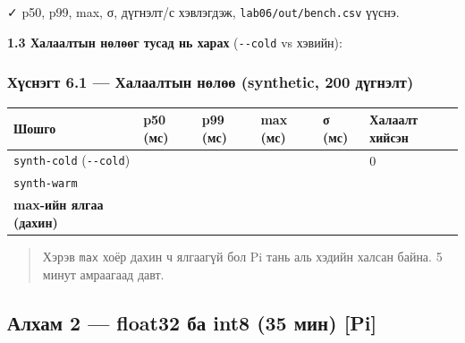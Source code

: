 ✓ p50, p99, max, σ, дүгнэлт/с хэвлэгдэж, \texttt{lab06/\allowbreak{}out/\allowbreak{}bench.\allowbreak{}csv} үүснэ.

\textbf{1.3 Халаалтын нөлөөг тусад нь харах} (\texttt{-\/-cold} vs хэвийн):

\begin{Shaded}
\begin{Highlighting}[]
 \KeywordTok{\textbackslash{}}
 \KeywordTok{\textbackslash{}}
\end{Highlighting}
\end{Shaded}

\hypertarget{ux445ux4afux441ux43dux44dux433ux442-6.1-ux445ux430ux43bux430ux430ux43bux442ux44bux43d-ux43dux4e9ux43bux4e9ux4e9-synthetic-200-ux434ux4afux433ux43dux44dux43bux442}{%
\subsubsection{Хүснэгт 6.1 --- Халаалтын нөлөө (synthetic, 200 дүгнэлт)}\label{ux445ux4afux441ux43dux44dux433ux442-6.1-ux445ux430ux43bux430ux430ux43bux442ux44bux43d-ux43dux4e9ux43bux4e9ux4e9-synthetic-200-ux434ux4afux433ux43dux44dux43bux442}}

\begingroup\scriptsize\begin{longtable}[]{@{}llllll@{}}
\toprule
Шошго & p50 (мс) & p99 (мс) & \textbf{max (мс)} & σ (мс) & Халаалт хийсэн\tabularnewline
\midrule
\endhead
\texttt{synth-cold} (\texttt{-\/-cold}) & & & & & 0\tabularnewline
\texttt{synth-warm} & & & & &\tabularnewline
\textbf{max-ийн ялгаа (дахин)} & & & & &\tabularnewline
\bottomrule
\end{longtable}\endgroup

\begin{quote}
Хэрэв \texttt{max} хоёр дахин ч ялгаагүй бол Pi тань аль хэдийн халсан байна. 5 минут амраагаад давт.
\end{quote}

\hypertarget{ux430ux43bux445ux430ux43c-2-float32-ux431ux430-int8-35-ux43cux438ux43d-pi}{%
\subsection{Алхам 2 --- float32 ба int8 (35 мин) {[}Pi{]}}\label{ux430ux43bux445ux430ux43c-2-float32-ux431ux430-int8-35-ux43cux438ux43d-pi}}


